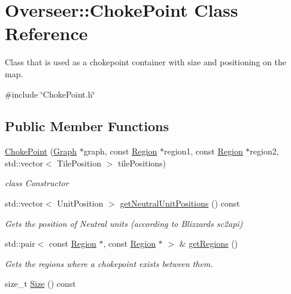 \hypertarget{classOverseer_1_1ChokePoint}{}\section{Overseer\+:\+:Choke\+Point Class Reference}
\label{classOverseer_1_1ChokePoint}


Class that is used as a chokepoint container with size and positioning on the map.  




{\ttfamily \#include \char`\"{}Choke\+Point.\+h\char`\"{}}

\subsection*{Public Member Functions}
\begin{DoxyCompactItemize}
\item 
\hyperlink{classOverseer_1_1ChokePoint_a931b3cd819ec712833ae3857dcab4f7a}{Choke\+Point} (\hyperlink{classOverseer_1_1Graph}{Graph} $\ast$graph, const \hyperlink{classOverseer_1_1Region}{Region} $\ast$region1, const \hyperlink{classOverseer_1_1Region}{Region} $\ast$region2, std\+::vector$<$ Tile\+Position $>$ tile\+Positions)
\begin{DoxyCompactList}\small\item\em class Constructor \end{DoxyCompactList}\item 
std\+::vector$<$ Unit\+Position $>$ \hyperlink{classOverseer_1_1ChokePoint_afe705cbfcb9948d3569f9355f3a639d9}{get\+Neutral\+Unit\+Positions} () const 
\begin{DoxyCompactList}\small\item\em Gets the position of Neutral units (according to Blizzard\textquotesingle{}s sc2api) \end{DoxyCompactList}\item 
std\+::pair$<$ const \hyperlink{classOverseer_1_1Region}{Region} $\ast$, const \hyperlink{classOverseer_1_1Region}{Region} $\ast$ $>$ \& \hyperlink{classOverseer_1_1ChokePoint_a8bc3320e7dd714d44808133f6b5b4e2b}{get\+Regions} ()
\begin{DoxyCompactList}\small\item\em Gets the regions where a chokepoint exists between them. \end{DoxyCompactList}\item 
size\+\_\+t \hyperlink{classOverseer_1_1ChokePoint_a7fd40fd88577c1bbf5c462fe03485f15}{Size} () const 

\end{DoxyCompactItemize}
